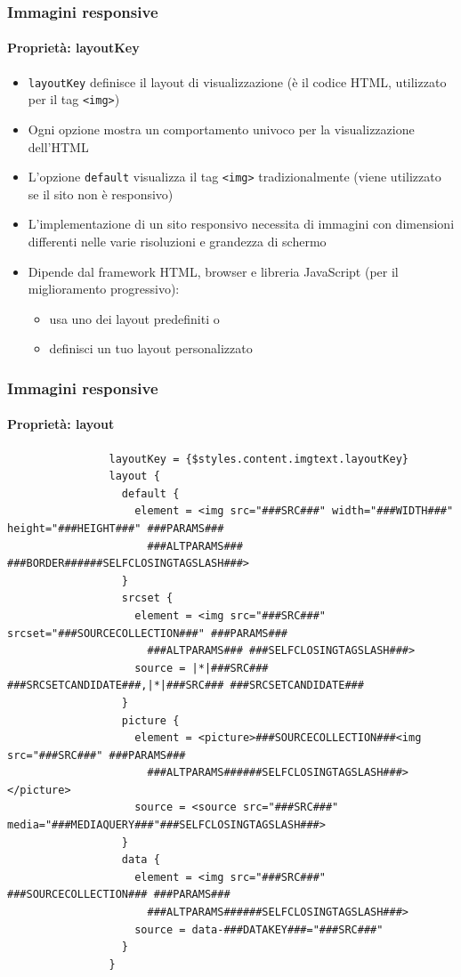 \begin{frame}[fragile]
	\frametitle{Immagini responsive}
	\framesubtitle{Proprietà: layoutKey}

	\begin{itemize}
		\item \texttt{layoutKey} definisce il layout di visualizzazione\newline
			(è il codice HTML, utilizzato per il tag \texttt{<img>})
		\item Ogni opzione mostra un comportamento univoco per la visualizzazione dell'HTML
		\item L'opzione \texttt{default} visualizza il tag \texttt{<img>} tradizionalmente\newline
			(viene utilizzato se il sito non è responsivo)
		\item L'implementazione di un sito responsivo necessita di immagini con dimensioni differenti nelle varie risoluzioni e grandezza di schermo
		\item Dipende dal framework HTML, browser e libreria JavaScript (per il miglioramento progressivo):

			\begin{itemize}
				\item usa uno dei layout predefiniti o
				\item definisci un tuo layout personalizzato
			\end{itemize}

	\end{itemize}

\end{frame}


\begin{frame}[fragile]
	\frametitle{Immagini responsive}
	\framesubtitle{Proprietà: layout}

			\lstset{
				basicstyle=\tiny\ttfamily
			}

			\begin{lstlisting}
				layoutKey = {$styles.content.imgtext.layoutKey}
				layout {
				  default {
				    element = <img src="###SRC###" width="###WIDTH###" height="###HEIGHT###" ###PARAMS###
				      ###ALTPARAMS### ###BORDER######SELFCLOSINGTAGSLASH###>
				  }
				  srcset {
				    element = <img src="###SRC###" srcset="###SOURCECOLLECTION###" ###PARAMS###
				      ###ALTPARAMS### ###SELFCLOSINGTAGSLASH###>
				    source = |*|###SRC### ###SRCSETCANDIDATE###,|*|###SRC### ###SRCSETCANDIDATE###
				  }
				  picture {
				    element = <picture>###SOURCECOLLECTION###<img src="###SRC###" ###PARAMS###
				      ###ALTPARAMS######SELFCLOSINGTAGSLASH###></picture>
				    source = <source src="###SRC###" media="###MEDIAQUERY###"###SELFCLOSINGTAGSLASH###>
				  }
				  data {
				    element = <img src="###SRC###" ###SOURCECOLLECTION### ###PARAMS###
				      ###ALTPARAMS######SELFCLOSINGTAGSLASH###>
				    source = data-###DATAKEY###="###SRC###"
				  }
				}
			\end{lstlisting}

\end{frame}

